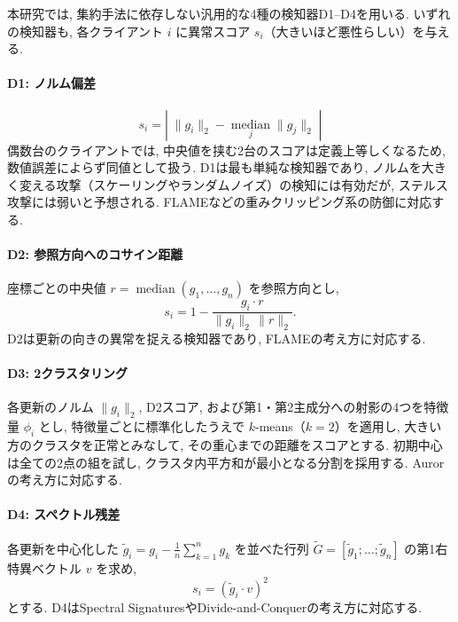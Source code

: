 \documentclass[a4j, twocolumn, dvipdfmx]{jsarticle}
\begin{document}
本研究では, 集約手法に依存しない汎用的な4種の検知器D1--D4を用いる. いずれの検知器も, 各クライアント $i$ に異常スコア $s_i$（大きいほど悪性らしい）を与える.

\paragraph{D1: ノルム偏差}
\begin{equation}
s_i = \left|\; \|g_i\|_2 - \operatorname*{median}_{j}\|g_j\|_2 \;\right|
\end{equation}
偶数台のクライアントでは, 中央値を挟む2台のスコアは定義上等しくなるため, 数値誤差によらず同値として扱う. D1は最も単純な検知器であり, ノルムを大きく変える攻撃（スケーリングやランダムノイズ）の検知には有効だが, ステルス攻撃には弱いと予想される. FLAME\cite{nguyen2022flame}などの重みクリッピング系の防御に対応する.

\paragraph{D2: 参照方向へのコサイン距離}
座標ごとの中央値 $r = \operatorname{median}(g_1,\dots,g_n)$ を参照方向とし,
\begin{equation}
s_i = 1 - \frac{g_i \cdot r}{\|g_i\|_2\,\|r\|_2}.
\end{equation}
D2は更新の向きの異常を捉える検知器であり, FLAME\cite{nguyen2022flame}の考え方に対応する.

\paragraph{D3: 2クラスタリング}
各更新のノルム $\|g_i\|_2$, D2スコア, および第1・第2主成分への射影の4つを特徴量 $\phi_i$ とし, 特徴量ごとに標準化したうえで $k$-means（$k=2$）を適用し, 大きい方のクラスタを正常とみなして, その重心までの距離をスコアとする. 初期中心は全ての2点の組を試し, クラスタ内平方和が最小となる分割を採用する. Auror\cite{shen2016auror}の考え方に対応する.

\paragraph{D4: スペクトル残差}
各更新を中心化した $\tilde{g}_i = g_i - \frac{1}{n}\sum_{k=1}^{n} g_k$ を並べた行列 $\tilde{G} = [\tilde{g}_1;\dots;\tilde{g}_n]$ の第1右特異ベクトル $v$ を求め,
\begin{equation}
s_i = (\tilde{g}_i \cdot v)^2
\end{equation}
とする. D4はSpectral Signatures\cite{tran2018spectral}やDivide-and-Conquer\cite{shejwalkar2021manipulating}の考え方に対応する.
\end{document}
